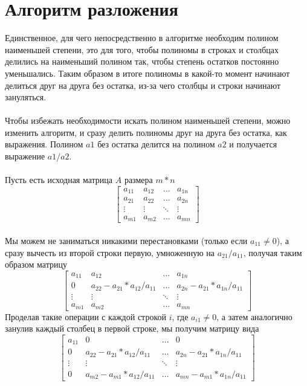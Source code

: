\documentclass[14pt, a4paper]{extreport}
\begin{document}
	\section{Алгоритм разложения}
	Единственное, для чего непосредственно в алгоритме необходим полином наименьшей степени, это для того, чтобы полиномы в строках и столбцах
	делились на наименьший полином так, чтобы степень остатков постоянно уменьшались. Таким образом в итоге полиномы в какой-то момент
	начинают делиться друг на друга без остатка, из-за чего столбцы и строки начинают зануляться.\\\\
	Чтобы избежать необходимости искать полином наименьшей степени, можно изменить алгоритм, и сразу делить полиномы друг на друга без остатка, как выражения.
	Полином $a1$ без остатка делится на полином $a2$ и получается выражение $a1/a2$.\\\\
	Пусть есть исходная матрица $A$ размера $m*n$
	\[
		\begin{bmatrix}
			a_{11} & a_{12} & \dots & a_{1n} \\
			a_{21} & a_{22} & \dots & a_{2n} \\
			\vdots & \vdots & \ddots & \vdots \\
			a_{m1} & a_{m2} & \dots & a_{mn}
		\end{bmatrix}
	\]\\
	Мы можем не заниматься никакими перестановками (только если $a_{11} \neq 0$), а сразу вычесть из второй строки первую, умноженную на
	$a_{21}/a_{11}$, получая таким образом матрицу
	\[
		\begin{bmatrix}
			a_{11} & a_{12} & \dots & a_{1n} \\
			0      & a_{22} - a_{21}*a_{12}/a_{11} & \dots & a_{2n} - a_{21}*a_{1n}/a_{11} \\
			\vdots & \vdots & \ddots & \vdots \\
			a_{m1} & a_{m2} & \dots & a_{mn}
		\end{bmatrix}
	\]
	Проделав такие операции с каждой строкой $i$, где $a_{i1} \neq 0$, а затем аналогично занулив каждый столбец в первой строке, мы получим
	матрицу вида
	\[
		\begin{bmatrix}
			a_{11} & 0 & \dots & 0 \\
			0      & a_{22} - a_{21}*a_{12}/a_{11} & \dots & a_{2n} - a_{21}*a_{1n}/a_{11} \\
			\vdots & \vdots & \ddots & \vdots \\
			0      & a_{m2} - a_{m1}*a_{12}/a_{11} & \dots & a_{mn} - a_{m1}*a_{1n}/a_{11}
		\end{bmatrix}
	\]
\end{document}
